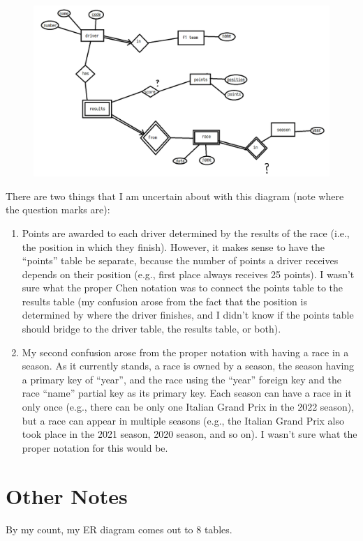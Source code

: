 \documentclass{article} %
\begin{document}
\begin{figure}[H]
    \centering
    \includegraphics[scale=0.27]{f1_ER_diagram.png}
\end{figure}

There are two things that I am uncertain about with this diagram (note
where the question marks are):
\begin{enumerate}[label=(\arabic*)]
    \item Points are awarded to each driver determined by the results of
    the race (i.e., the position in which they finish). However, it
    makes sense to have the ``points'' table be separate, because the
    number of points a driver receives depends on their position (e.g.,
    first place always receives 25 points). I wasn't sure what the
    proper Chen notation was to connect the points table to the results
    table (my confusion arose from the fact that the position is
    determined by where the driver finishes, and I didn't know if the
    points table should bridge to the driver table, the results table,
    or both).

    \item My second confusion arose from the proper notation with having
    a race in a season. As it currently stands, a race is owned by a
    season, the season having a primary key of ``year'', and the race
    using the ``year'' foreign key and the race ``name'' partial key as
    its primary key. Each season can have a race in it only once (e.g.,
    there can be only one Italian Grand Prix in the 2022 season), but a
    race can appear in multiple seasons (e.g., the Italian Grand Prix
    also took place in the 2021 season, 2020 season, and so on). I
    wasn't sure what the proper notation for this would be.
\end{enumerate}

\section{Other Notes}

By my count, my ER diagram comes out to 8 tables.
\end{document}
